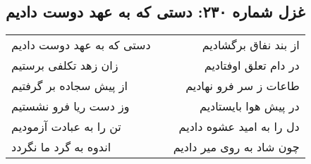\begin{center}
\section*{غزل شماره ۲۳۰: دستی که به عهد دوست دادیم}
\label{sec:230}
\begin{longtable}{l p{0.5cm} r}
دستی که به عهد دوست دادیم
&&
از بند نفاق برگشادیم
\\
زان زهد تکلفی برستیم
&&
در دام تعلق اوفتادیم
\\
از پیش سجاده بر گرفتیم
&&
طاعات ز سر فرو نهادیم
\\
وز دست ریا فرو نشستیم
&&
در پیش هوا بایستادیم
\\
تن را به عبادت آزمودیم
&&
دل را به امید عشوه دادیم
\\
اندوه به گرد ما نگردد
&&
چون شاد به روی میر دادیم
\\
\end{longtable}
\end{center}
